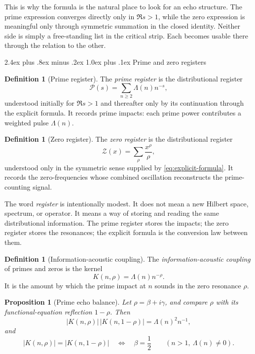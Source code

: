 \documentclass[11pt,a4paper]{article}
\makeatletter
\theoremstyle{plain}
\newtheorem{proposition}[theorem]{Proposition}
\theoremstyle{definition}
\newtheorem{definition}[theorem]{Definition}
\theoremstyle{remark}
\numberwithin{equation}{section}
\newcommand{\PF}{\mathcal{P}}
\newcommand{\ZF}{\mathcal{Z}}
\renewcommand{\subsection}{%
  \@startsection{subsection}{2}{0pt}%
    {2.4ex plus .8ex minus .2ex}%
    {1.0ex plus .1ex}%
    {\normalfont\Large\bfseries\color{headingAccent}}%
}
\makeatother
\begin{document}
This is why the formula is the natural place to look for an echo
structure.  The prime expression converges directly only in
\(\Re s>1\), while the zero expression is meaningful only through
symmetric summation in the closed identity.  Neither side is simply a
free-standing list in the critical strip.  Each becomes usable there
through the relation to the other.

\subsection{Prime and zero registers}

\begin{definition}[Prime register]
\label{def:prime-register}
The \emph{prime register} is the distributional register
\[
  \PF(s)=\sum_{n\ge2}\Lambda(n)n^{-s},
\]
understood initially for \(\Re s>1\) and thereafter only by its
continuation through the explicit formula.  It records prime impacts:
each prime power contributes a weighted pulse \(\Lambda(n)\).
\end{definition}

\begin{definition}[Zero register]
\label{def:zero-register}
The \emph{zero register} is the distributional register
\[
  \ZF(x)=\sum_{\rho}\frac{x^\rho}{\rho},
\]
understood only in the symmetric sense supplied by
\eqref{eq:explicit-formula}.  It records the zero-frequencies whose
combined oscillation reconstructs the prime-counting signal.
\end{definition}

The word \emph{register} is intentionally modest.  It does not mean a
new Hilbert space, spectrum, or operator.  It means a way of storing and
reading the same distributional information.  The prime register stores
the impacts; the zero register stores the resonances; the explicit
formula is the conversion law between them.

\begin{definition}[Information-acoustic coupling]
The \emph{information-acoustic coupling} of primes and zeros is the
kernel
\[
  K(n,\rho)=\Lambda(n)n^{-\rho}.
\]
It is the amount by which the prime impact at \(n\) sounds in the zero
resonance \(\rho\).
\end{definition}

\begin{proposition}[Prime echo balance]
\label{prop:prime-echo-balance}
Let \(\rho=\beta+i\gamma\), and compare \(\rho\) with its
functional-equation reflection \(1-\rho\).  Then
\[
  |K(n,\rho)|\,|K(n,1-\rho)|
  =
  \Lambda(n)^2 n^{-1},
  \label{eq:kernel-product}
\]
and
\[
  |K(n,\rho)|=|K(n,1-\rho)|
  \quad\Longleftrightarrow\quad
  \beta=\frac12
  \qquad (n>1,\ \Lambda(n)\ne0).
\]
\end{proposition}
\end{document}
